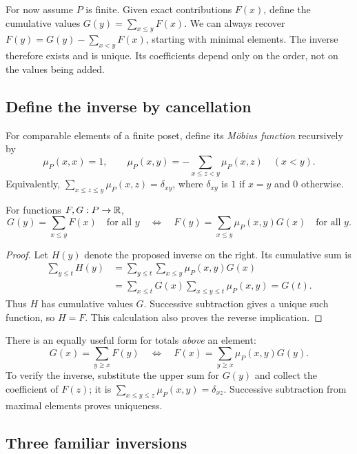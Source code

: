 For now assume $P$ is finite. Given exact contributions $F(x)$, define
the cumulative values $G(y)=\sum_{x\le y}F(x)$. We can always recover
$F(y)=G(y)-\sum_{x<y}F(x)$, starting with minimal elements.
The inverse therefore exists and is unique. Its coefficients depend
only on the order, not on the values being added.

\subsection{Define the inverse by cancellation}

\begin{definition}
For comparable elements of a finite poset, define its
\emph{M\"obius function} recursively by
\[
 \mu_P(x,x)=1,\qquad
 \mu_P(x,y)=-\sum_{x\le z<y}\mu_P(x,z)\quad(x<y).
\]
Equivalently,
$\sum_{x\le z\le y}\mu_P(x,z)=\delta_{xy}$, where
$\delta_{xy}$ is $1$ if $x=y$ and $0$ otherwise.
\end{definition}

\begin{theorem}
For functions $F,G:P\to\mathbb R$,
\[
 G(y)=\sum_{x\le y}F(x)\quad\text{for all }y
 \quad\Longleftrightarrow\quad
 F(y)=\sum_{x\le y}\mu_P(x,y)G(x)\quad\text{for all }y.
\]
\end{theorem}
\begin{proof}
Let $H(y)$ denote the proposed inverse on the right. Its cumulative
sum is
\[
 \begin{aligned}
 \sum_{y\le t}H(y)
 &=\sum_{y\le t}\sum_{x\le y}\mu_P(x,y)G(x)\\
 &=\sum_{x\le t}G(x)\sum_{x\le y\le t}\mu_P(x,y)=G(t).
 \end{aligned}
\]
Thus $H$ has cumulative values $G$. Successive subtraction gives
a unique such function, so $H=F$. This calculation also proves the
reverse implication.
\end{proof}

There is an equally useful form for totals \emph{above} an element:
\[
 G(x)=\sum_{y\ge x}F(y)
 \quad\Longleftrightarrow\quad
 F(x)=\sum_{y\ge x}\mu_P(x,y)G(y).
\]
To verify the inverse, substitute the upper sum for $G(y)$ and collect
the coefficient of $F(z)$; it is
$\sum_{x\le y\le z}\mu_P(x,y)=\delta_{xz}$.
Successive subtraction from maximal elements proves uniqueness.

\subsection{Three familiar inversions}

